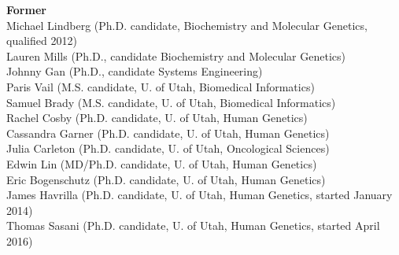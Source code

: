 \documentclass[margin,line]{cv}
\begin{document}
\begin{resume}
    \textbf{Former} \\
    Michael Lindberg (Ph.D. candidate, Biochemistry and Molecular Genetics, qualified 2012)\\
    Lauren Mills (Ph.D., candidate Biochemistry and Molecular Genetics)\\
	Johnny Gan (Ph.D., candidate Systems Engineering) \\
    Paris Vail (M.S. candidate, U. of Utah, Biomedical Informatics) \\
    Samuel Brady (M.S. candidate, U. of Utah, Biomedical Informatics)\\
    Rachel Cosby (Ph.D. candidate, U. of Utah, Human Genetics)\\
    Cassandra Garner (Ph.D. candidate, U. of Utah, Human Genetics)\\
    Julia Carleton (Ph.D. candidate, U. of Utah, Oncological Sciences)\\
    Edwin Lin (MD/Ph.D. candidate, U. of Utah, Human Genetics)\\
    Eric Bogenschutz (Ph.D. candidate, U. of Utah, Human Genetics)\\
    James Havrilla (Ph.D. candidate, U. of Utah, Human Genetics, started January 2014) \\
    Thomas Sasani (Ph.D. candidate, U. of Utah, Human Genetics, started April 2016) \\




\end{resume}
\end{document}
